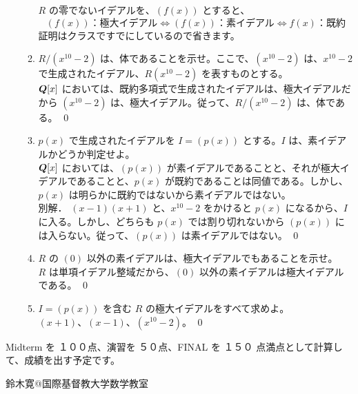 \begin{enumerate}
\begin{enumerate}
     $R$ の零でないイデアルを、$(f(x))$ とすると、
     $$(f(x))\mbox{：極大イデアル} \Leftrightarrow (f(x))\mbox{：素イデアル}\Leftrightarrow f(x)\mbox{：既約}$$
     証明はクラスですでにしているので省きます。
     
     \item $R/(x^{10} - 2)$ は、体であることを示せ。ここで、$(x^{10} - 2)$ は、$x^{10}-2$ で生成されたイデアル、$R(x^{10}-2)$ を表すものとする。\\
     \sol
     $\mbox{\boldmath $Q$}[x]$ においては、既約多項式で生成されたイデアルは、極大イデアルだから $(x^{10}-2)$ は、極大イデアル。従って、$R/(x^{10} - 2)$ は、体である。
     \qed
     
     \item $p(x)$ で生成されたイデアルを $I = (p(x))$ とする。$I$ は、素イデアルかどうか判定せよ。\\
     \sol
     $\mbox{\boldmath $Q$}[x]$ においては、$(p(x))$ が素イデアルであることと、それが極大イデアルであることと、$p(x)$  が既約であることは同値である。しかし、$p(x)$ は明らかに既約ではないから素イデアルではない。\\
     {\gt 別解．}\quad
     $(x-1)(x+1)$ と、$x^{10}-2$ をかけると $p(x)$ になるから、$I$ に入る。しかし、どちらも $p(x)$ では割り切れないから $(p(x))$ には入らない。従って、$(p(x))$ は素イデアルではない。
     \qed
     
     \item $R$ の $(0)$ 以外の素イデアルは、極大イデアルでもあることを示せ。\\
     \sol
     $R$ は単項イデアル整域だから、$(0)$ 以外の素イデアルは極大イデアルである。
     \qed
     
     \item $I = (p(x))$ を含む $R$ の極大イデアルをすべて求めよ。\\
     \sol
     $(x+1)$、$(x-1)$、$(x^{10}-2)$。
     \qed
     
     \end{enumerate}
\end{enumerate}

\vspace{2ex}
\noindent
Midterm を １００点、演習を ５０点、FINAL を １５０ 点満点として計算して、成績を出す予定です。

\begin{flushright}
鈴木寛@国際基督教大学数学教室
\end{flushright}
